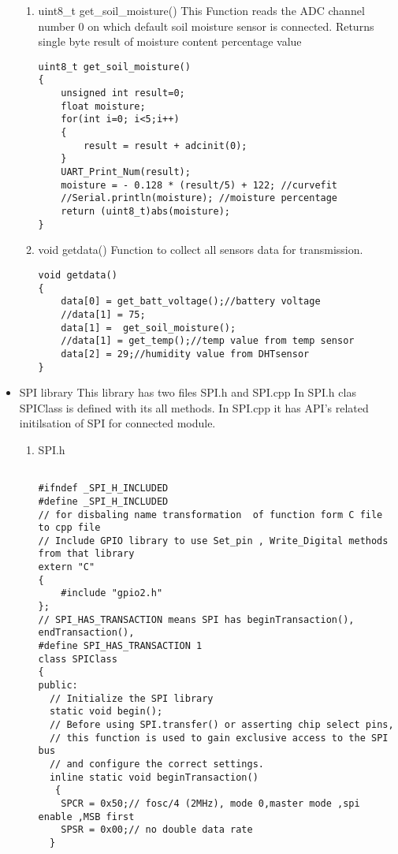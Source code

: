 \documentclass{article}
\begin{document}
\begin{itemize}
\begin{enumerate}
\item uint8\_t get\_soil\_moisture()
\newline This Function reads the ADC channel number 0 on which default soil moisture sensor is connected.
\newline Returns single byte result of moisture content percentage value
\begin{lstlisting}
uint8_t get_soil_moisture()
{
	unsigned int result=0;
	float moisture;
	for(int i=0; i<5;i++)
	{
		result = result + adcinit(0);
	}
	UART_Print_Num(result);
	moisture = - 0.128 * (result/5) + 122; //curvefit
	//Serial.println(moisture); //moisture percentage
	return (uint8_t)abs(moisture);
}
\end{lstlisting}

\item void getdata()
\newline Function to collect all sensors data for transmission.
\begin{lstlisting}
void getdata()
{
	data[0] = get_batt_voltage();//battery voltage
	//data[1] = 75;
	data[1] =  get_soil_moisture();
	//data[1] = get_temp();//temp value from temp sensor
	data[2] = 29;//humidity value from DHTsensor
}
\end{lstlisting}

\end{enumerate}
\item SPI library
\newline This library has two files SPI.h and SPI.cpp 
\newline In SPI.h clas SPIClass is defined with its all methods.
\newline In SPI.cpp it has API's related  initilsation of SPI for connected module.
\begin{enumerate}
\item SPI.h
\begin{lstlisting}

#ifndef _SPI_H_INCLUDED
#define _SPI_H_INCLUDED
// for disbaling name transformation  of function form C file to cpp file 
// Include GPIO library to use Set_pin , Write_Digital methods from that library
extern "C"
{
	#include "gpio2.h"
};
// SPI_HAS_TRANSACTION means SPI has beginTransaction(), endTransaction(), 
#define SPI_HAS_TRANSACTION 1
class SPIClass
{
public:
  // Initialize the SPI library
  static void begin();
  // Before using SPI.transfer() or asserting chip select pins,
  // this function is used to gain exclusive access to the SPI bus
  // and configure the correct settings.
  inline static void beginTransaction()
   {
    SPCR = 0x50;// fosc/4 (2MHz), mode 0,master mode ,spi enable ,MSB first
    SPSR = 0x00;// no double data rate 
  }


\end{lstlisting}
\end{enumerate}
\end{itemize}
\end{document}

